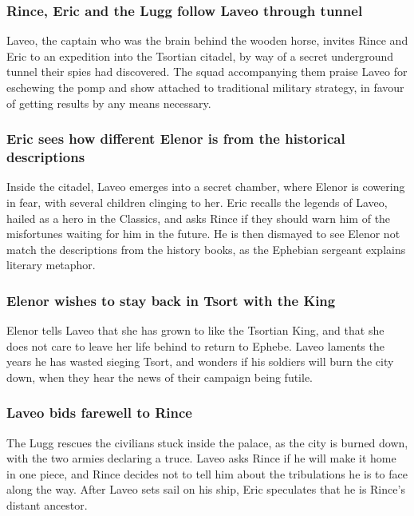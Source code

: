 \subsubsection{\Gls{Rince}, \Gls{Eric} and the \Gls{Lugg} follow \Gls{Laveo} through tunnel}
\Gls{Laveo}, the captain who was the brain behind the wooden horse, invites \Gls{Rince} and
\Gls{Eric} to an expedition into the Tsortian citadel, by way of a secret underground tunnel their
spies had discovered. The squad accompanying them praise \Gls{Laveo} for eschewing the pomp and show
attached to traditional military strategy, in favour of getting results by any means necessary.

\subsubsection{\Gls{Eric} sees how different \Gls{Elenor} is from the historical descriptions}
Inside the citadel, \Gls{Laveo} emerges into a secret chamber, where \Gls{Elenor} is cowering in
fear, with several children clinging to her. \Gls{Eric} recalls the legends of \Gls{Laveo}, hailed
as a hero in the Classics, and asks \Gls{Rince} if they should warn him of the misfortunes waiting
for him in the future. He is then dismayed to see \Gls{Elenor} not match the descriptions from the
history books, as the Ephebian sergeant explains literary metaphor.

\subsubsection{\Gls{Elenor} wishes to stay back in Tsort with the King}
\Gls{Elenor} tells \Gls{Laveo} that she has grown to like the Tsortian King, and that she does not
care to leave her life behind to return to Ephebe. \Gls{Laveo} laments the years he has wasted
sieging Tsort, and wonders if his soldiers will burn the city down, when they hear the news of their
campaign being futile.

\subsubsection{\Gls{Laveo} bids farewell to \Gls{Rince}}
The \Gls{Lugg} rescues the civilians stuck inside the palace, as the city is burned down, with the
two armies declaring a truce. \Gls{Laveo} asks \Gls{Rince} if he will make it home in one piece,
and \Gls{Rince} decides not to tell him about the tribulations he is to face along the way. After
\Gls{Laveo} sets sail on his ship, \Gls{Eric} speculates that he is \Gls{Rince}'s distant ancestor.

